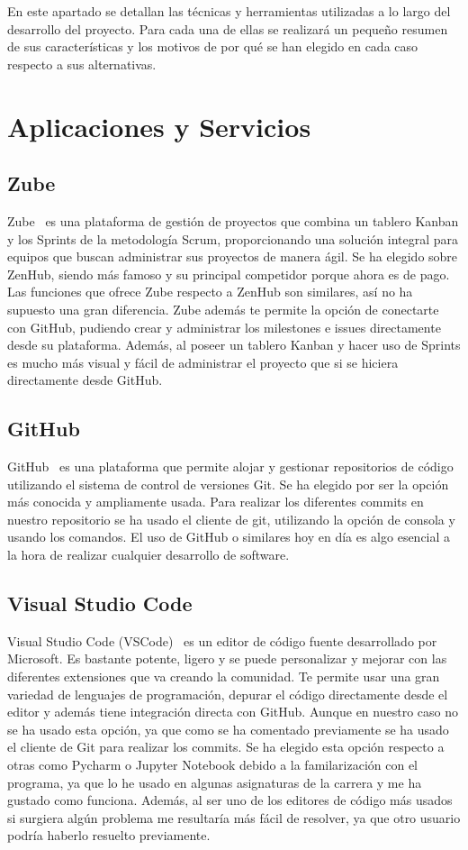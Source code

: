 En este apartado se detallan las técnicas y herramientas utilizadas a lo largo del desarrollo del proyecto. Para cada una de ellas se realizará un pequeño resumen de sus características y los motivos de por qué se han elegido en cada caso respecto a sus alternativas.


\section{Aplicaciones y Servicios}
\subsection{Zube}
Zube~\cite{zube} es una plataforma de gestión de proyectos que combina un tablero Kanban y los Sprints de la metodología Scrum, proporcionando una solución integral para equipos que buscan administrar sus proyectos de manera ágil. Se ha elegido sobre ZenHub, siendo más famoso y su principal competidor porque ahora es de pago. Las funciones que ofrece Zube respecto a ZenHub son similares, así no ha supuesto una gran diferencia. Zube además te permite la opción de conectarte con GitHub, pudiendo crear y administrar los milestones e issues directamente desde su plataforma. Además, al poseer un tablero Kanban y hacer uso de Sprints es mucho más visual y fácil de administrar el proyecto que si se hiciera directamente desde GitHub.

\subsection{GitHub}
GitHub~\cite{github} es una plataforma que permite alojar y gestionar repositorios de código utilizando el sistema de control de versiones Git. Se ha elegido por ser la opción más conocida y ampliamente usada. Para realizar los diferentes commits en nuestro repositorio se ha usado el cliente de git, utilizando la opción de consola y usando los comandos. El uso de GitHub o similares hoy en día es algo esencial a la hora de realizar cualquier desarrollo de software.

\subsection{Visual Studio Code}
Visual Studio Code (VSCode)~\cite{vscode} es un editor de código fuente desarrollado por Microsoft. Es bastante potente, ligero y se puede personalizar y mejorar con las diferentes extensiones que va creando la comunidad. Te permite usar una gran variedad de lenguajes de programación, depurar el código directamente desde el editor y además tiene integración directa con GitHub. Aunque en nuestro caso no se ha usado esta opción, ya que como se ha comentado previamente se ha usado el cliente de Git para realizar los commits. Se ha elegido esta opción respecto a otras como Pycharm o Jupyter Notebook debido a la familarización con el programa, ya que lo he usado en algunas asignaturas de la carrera y me ha gustado como funciona. Además, al ser uno de los editores de código más usados si surgiera algún problema me resultaría más fácil de resolver, ya que otro usuario podría haberlo resuelto previamente.


